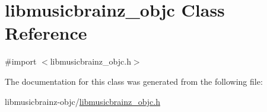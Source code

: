 \hypertarget{interfacelibmusicbrainz__objc}{\section{libmusicbrainz\-\_\-objc Class Reference}
\label{interfacelibmusicbrainz__objc}
}


{\ttfamily \#import $<$libmusicbrainz\-\_\-objc.\-h$>$}



The documentation for this class was generated from the following file\-:\begin{DoxyCompactItemize}
\item 
libmusicbrainz-\/objc/\hyperlink{libmusicbrainz__objc_8h}{libmusicbrainz\-\_\-objc.\-h}\end{DoxyCompactItemize}
